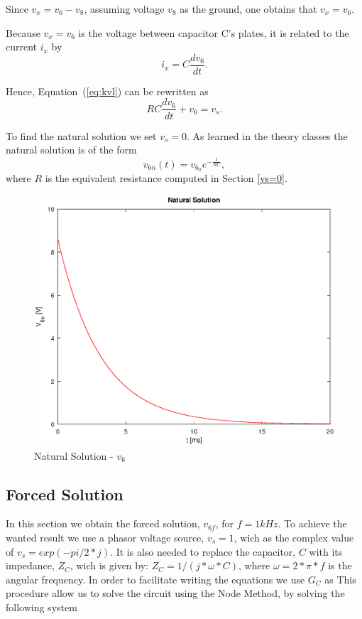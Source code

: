Since $v_{x}=v_{6}-v_{8}$, assuming voltage $v_8$ as the ground, one obtains that $v_{x}=v_{6}$.

Because $v_{x}=v_{6}$ is the voltage between capacitor C's plates, it is related to the
current $i_x$ by
\begin{equation}
  i_{x} = C\frac{dv_6}{dt}.
\end{equation}

Hence, Equation~(\ref{eq:kvl}) can be rewritten as
\begin{equation}
  RC\frac{dv_6}{dt} + v_6 = v_s.
  \label{eq:kvl2}
\end{equation}

To find the natural solution we set $v_{s}=0$.
As learned in the theory classes the natural solution is of the form
\begin{equation}
  v_{6n}(t) = v_{6_0}e^{-\frac{t}{RC}},
  \label{eq:vo_nat}
\end{equation}
where $R$ is the equivalent resistance computed in Section \ref{vs=0}. 


\begin{figure}[H] \centering
  \includegraphics[width=0.8\linewidth]{nat_sol.eps}
  \caption{Natural Solution - $v_6$}
  \label{fig:natural solution}
\end{figure}


\newpage
\subsection{Forced Solution}
\label{subsec:forced_solution}

In this section we obtain the forced solution, $v_{6f}$, for $f=1kHz$.
To achieve the wanted result we use a phasor voltage source, $v_{s}=1$, wich as the complex value of $v_{s}=exp(-pi/2*j)$.
It is also needed to replace the capacitor, $C$ with its impedance, $Z_C$, wich is given by: $Z_{C}= 1/(j*\omega*C)$, where $\omega=2*\pi*f$ is the angular frequency.
In order to facilitate writing the equations we use $G_C$ as %
This procedure allow us to solve the circuit using the Node Method, by solving the following system

